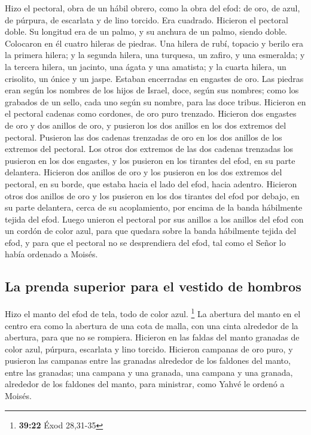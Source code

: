 \begin{paracol}{2}
 Hizo el pectoral, obra de un hábil obrero, como la obra
del efod: de oro, de azul, de púrpura, de escarlata y de lino torcido.
 Era cuadrado. Hicieron el pectoral doble. Su longitud era
de un palmo, y su anchura de un palmo, siendo doble. 
Colocaron en él cuatro hileras de piedras. Una hilera de rubí, topacio y
berilo era la primera hilera;  y la segunda hilera, una
turquesa, un zafiro, y una esmeralda;  y la tercera
hilera, un jacinto, una ágata y una amatista;  y la
cuarta hilera, un crisolito, un ónice y un jaspe. Estaban encerradas en
engastes de oro.  Las piedras eran según los nombres de
los hijos de Israel, doce, según sus nombres; como los grabados de un
sello, cada uno según su nombre, para las doce tribus. 
Hicieron en el pectoral cadenas como cordones, de oro puro trenzado.
 Hicieron dos engastes de oro y dos anillos de oro, y
pusieron los dos anillos en los dos extremos del pectoral.
 Pusieron las dos cadenas trenzadas de oro en los dos
anillos de los extremos del pectoral.  Los otros dos
extremos de las dos cadenas trenzadas los pusieron en los dos engastes,
y los pusieron en los tirantes del efod, en su parte delantera.
 Hicieron dos anillos de oro y los pusieron en los dos
extremos del pectoral, en su borde, que estaba hacia el lado del efod,
hacia adentro.  Hicieron otros dos anillos de oro y los
pusieron en los dos tirantes del efod por debajo, en su parte delantera,
cerca de su acoplamiento, por encima de la banda hábilmente tejida del
efod.  Luego unieron el pectoral por sus anillos a los
anillos del efod con un cordón de color azul, para que quedara sobre la
banda hábilmente tejida del efod, y para que el pectoral no se
desprendiera del efod, tal como el Señor lo había ordenado a Moisés.

\hypertarget{la-prenda-superior-para-el-vestido-de-hombros-1}{%
\subsection{La prenda superior para el vestido de
hombros}\label{la-prenda-superior-para-el-vestido-de-hombros-1}}

 Hizo el manto del efod de tela, todo de color azul.
\footnote{\textbf{39:22} Éxod 28,31-35}  La abertura del
manto en el centro era como la abertura de una cota de malla, con una
cinta alrededor de la abertura, para que no se rompiera. 
Hicieron en las faldas del manto granadas de color azul, púrpura,
escarlata y lino torcido.  Hicieron campanas de oro puro,
y pusieron las campanas entre las granadas alrededor de los faldones del
manto, entre las granadas;  una campana y una granada,
una campana y una granada, alrededor de los faldones del manto, para
ministrar, como Yahvé le ordenó a Moisés.


\end{paracol}
